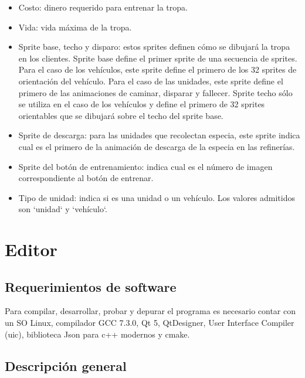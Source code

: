 \documentclass[titlepage,a4paper,12pt]{article}
\begin{document}
\begin{itemize}
\begin{itemize}
\item Costo: dinero requerido para entrenar la tropa.

\item Vida: vida máxima de la tropa.

\item Sprite base, techo y disparo: estos sprites definen cómo se dibujará la tropa en los clientes.  Sprite base define el primer sprite de una secuencia de sprites. Para el caso de los vehículos, este sprite define el primero de los 32 sprites de orientación del vehículo. Para el caso de las unidades, este sprite define el primero de las animaciones de caminar, disparar y fallecer.  Sprite techo sólo se utiliza en el caso de los vehículos y define el primero de 32 sprites orientables que se dibujará sobre el techo del sprite base.

\item Sprite de descarga: para las unidades que recolectan especia, este sprite indica cual es el primero de la animación de descarga de la especia en las refinerías.

\item Sprite del botón de entrenamiento: indica cual es el número de imagen correspondiente al botón de entrenar.

\item Tipo de unidad: indica si es una unidad o un vehículo. Los valores admitidos son `unidad` y `vehículo`.

\end{itemize}

\end{itemize}

\newpage
\section{Editor}

\subsection{Requerimientos de software}
Para compilar, desarrollar, probar y depurar el programa es necesario contar con un SO Linux, compilador GCC 7.3.0, Qt 5, QtDesigner, User Interface Compiler (uic), biblioteca Json para c++ modernos y cmake.

\subsection{Descripción general}
\end{document}
